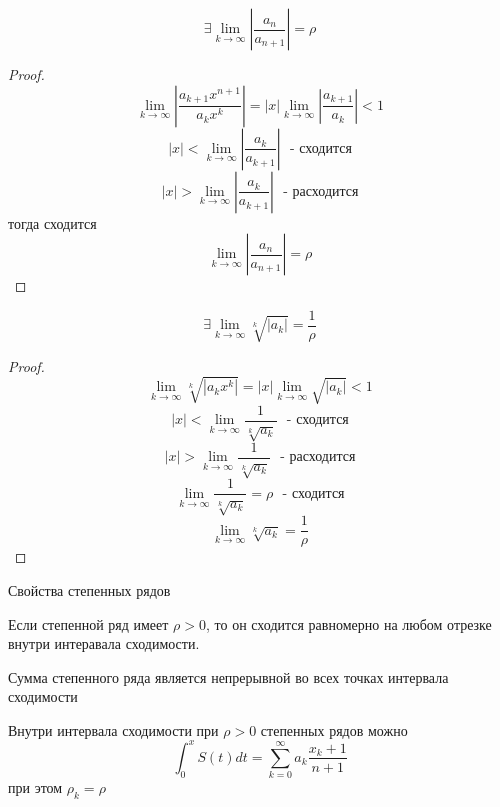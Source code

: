 \begin{theorem}
  $$
  \exists \lim_{k \to \infty} \left| \frac{a_n}{a_{n+1}} \right| = \rho
  $$
\end{theorem}

\begin{proof}
  $$
  \lim_{k \to \infty} \left| \frac{a_{k+1} x^{n+1}}{a_k x^k} \right| =
  |x| \lim_{k \to \infty} \left| \frac{a_{k+1}}{a_k} \right| < 1
  $$
  $$
  |x| < \lim_{k \to \infty} \left| \frac{a_k}{a_{k+1}} \right| ~~~
  \text{- сходится}
  $$
  $$
  |x| > \lim_{k \to \infty} \left| \frac{a_k}{a_{k+1}} \right| ~~~
  \text{- расходится}
  $$
  тогда сходится
  $$
  \lim_{k \to \infty} \left| \frac{a_n}{a_{n+1}} \right| = \rho
  $$
\end{proof}

\begin{theorem}
  $$
  \exists \lim_{k \to \infty} \sqrt[k]{|a_k|} = \frac{1}{\rho}
  $$
\end{theorem}

\begin{proof}
  $$
  \lim_{k \to \infty} \sqrt[k]{|a_k x^k|} = |x| \lim_{k \to \infty} \sqrt{|a_k|}
  < 1
  $$
  $$
  |x| < \lim_{k \to \infty} \frac{1}{\sqrt[k]{a_k}} ~~~ \text{- сходится}
  $$
  $$
  |x| > \lim_{k \to \infty} \frac{1}{\sqrt[k]{a_k}} ~~~ \text{- расходится}
  $$
  $$
  \lim_{k \to \infty} \frac{1}{\sqrt[k]{a_k}} = \rho ~~~ \text{- сходится}
  $$
  $$
  \lim_{k \to \infty} \sqrt[k]{a_k} = \frac{1}{\rho}
  $$
\end{proof}

\begin{title}[\Large]
  Свойства степенных рядов
\end{title}

\begin{theorem}
  Если степенной ряд имеет $\rho > 0$, то он сходится равномерно
  на любом отрезке внутри интеравала сходимости.
\end{theorem}

\begin{block}[Следствие 1]
  Сумма степенного ряда является непрерывной во всех точках интервала сходимости
\end{block}

\begin{block}[Следствие 2]
  Внутри интервала сходимости при $\rho > 0$ степенных рядов можно
  $$
  \int_0^x S(t)dt = \sum_{k=0}^{\infty} a_k \frac{x_k+1}{n+1}
  $$
  при этом $\rho_k = \rho$
\end{block}

